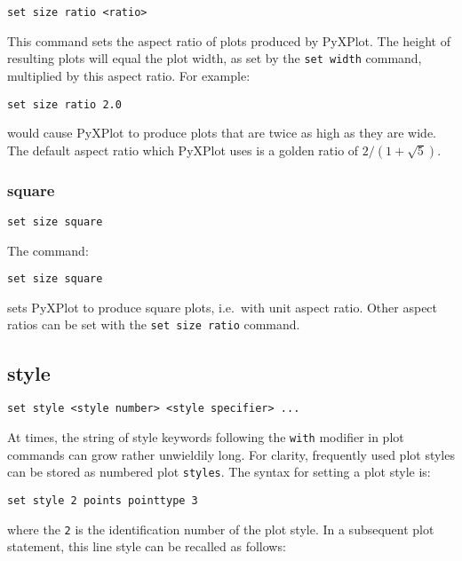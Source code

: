 \begin{verbatim}
set size ratio <ratio>
\end{verbatim}

This command sets the aspect ratio of plots produced by PyXPlot.  The height of
resulting plots will equal the plot width, as set by the {\tt set width}
command, multiplied by this aspect ratio.  For example:

\begin{verbatim}
set size ratio 2.0
\end{verbatim}

\noindent would cause PyXPlot to produce plots that are twice as high as they
are wide.  The default aspect ratio which PyXPlot uses is a golden ratio of
$2/(1+\sqrt{5})$.


\subsubsection{square}

\begin{verbatim}
set size square
\end{verbatim}

The command:

\begin{verbatim}
set size square
\end{verbatim}

\noindent sets PyXPlot to produce square plots, i.e.\ with unit aspect ratio. Other aspect
ratios can be set with the {\tt set size ratio} command.


\subsection{style}

\begin{verbatim}
set style <style number> <style specifier> ...
\end{verbatim}

At times, the string of style keywords following the {\tt with} modifier in
plot commands can grow rather unwieldily long. For clarity, frequently used
plot styles can be stored as numbered plot {\tt styles}. The syntax for setting
a plot style is:

\begin{verbatim}
set style 2 points pointtype 3
\end{verbatim}

\noindent where the {\tt 2} is the identification number of the plot style.
In a subsequent plot statement, this line style can be recalled as follows:

